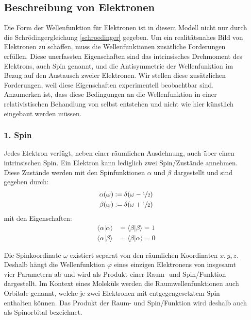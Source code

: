 \subsection{Beschreibung von Elektronen}\label{section_slater}
Die Form der Wellenfunktion für Elektronen ist in diesem Modell nicht nur 
durch die Schrödingergleichung \cref{schroedinger} gegeben.
Um ein realitätsnahes Bild von Elektronen zu schaffen,
muss die Wellenfunktionen zusätliche Forderungen erfüllen.
Diese unerfassten Eigenschaften sind das intrinsisches Drehmoment des Elektrons,
auch Spin genannt, und die Antisymmetrie der Wellenfunktion
im Bezug auf den Austausch zweier Elektronen.
Wir stellen diese zusätzlichen Forderungen,
weil diese Eigenschaften experimentell beobachtbar sind.
Anzumerken ist, dass diese Bedingungen an die Wellenfunktion 
in einer relativistischen Behandlung von selbst entstehen
und nicht wie hier künstlich eingebaut werden müssen.

\cite[S. 265, 270]{levine_2019}
\cite[4.5.3]{cramer_2004}

\subsubsection*{1. Spin}
Jedes Elektron verfügt, neben einer räumlichen Ausdehnung, 
auch über einen intrinsischen Spin. 
Ein Elektron kann lediglich zwei Spin\-/Zustände annehmen.
Diese Zustände werden mit den Spinfunktionen $\alpha$ und
$\beta$ dargestellt und sind gegeben durch:
\begin{equation}\label{spin_function}
  \begin{aligned}
    \alpha(\omega) &:= \delta(\omega - \nicefrac{1}{2})\\
    \beta(\omega) &:= \delta(\omega + \nicefrac{1}{2})
  \end{aligned}
\end{equation}
mit den Eigenschaften:
\begin{equation}\label{spin_product}
  \begin{aligned}
    \langle \alpha \vert \alpha \rangle &= \langle \beta \vert \beta \rangle = 1 \\
    \langle \alpha \vert \beta \rangle &= \langle \beta \vert \alpha \rangle = 0
  \end{aligned}
\end{equation}

Die Spinkoordinate $\omega$ existiert separat von den räumlichen Koordinaten $x,y,z$.
Deshalb hängt die Wellenfunktion $\varphi$ eines einzigen Elektronens
von insgesamt vier Parametern ab
und wird als Produkt einer Raum- und Spin\-/Funktion dargestellt.
Im Kontext eines Moleküls werden die Raumwellenfunktionen auch Orbitale genannt, welche
je zwei Elektronen mit entgegengesetztem Spin enthalten können.
Das Produkt der Raum- und Spin\-/Funktion wird deshalb auch als Spinorbital bezeichnet.

